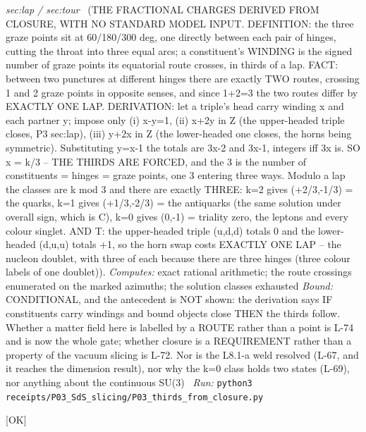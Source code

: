 \begin{description}
\textit{sec:lap / sec:tour} \ (THE FRACTIONAL CHARGES DERIVED FROM CLOSURE, WITH NO STANDARD MODEL INPUT. DEFINITION: the three graze points sit at 60/180/300 deg, one directly between each pair of hinges, cutting the throat into three equal arcs; a constituent's WINDING is the signed number of graze points its equatorial route crosses, in thirds of a lap. FACT: between two punctures at different hinges there are exactly TWO routes, crossing 1 and 2 graze points in opposite senses, and since 1+2=3 the two routes differ by EXACTLY ONE LAP. DERIVATION: let a triple's head carry winding x and each partner y; impose only (i) x-y=1, (ii) x+2y in Z (the upper-headed triple closes, P3 sec:lap), (iii) y+2x in Z (the lower-headed one closes, the horns being symmetric). Substituting y=x-1 the totals are 3x-2 and 3x-1, integers iff 3x is. SO x = k/3 -- THE THIRDS ARE FORCED, and the 3 is the number of constituents = hinges = graze points, one 3 entering three ways. Modulo a lap the classes are k mod 3 and there are exactly THREE: k=2 gives (+2/3,-1/3) = the quarks, k=1 gives (+1/3,-2/3) = the antiquarks (the same solution under overall sign, which is C), k=0 gives (0,-1) = triality zero, the leptons and every colour singlet. AND T: the upper-headed triple (u,d,d) totals 0 and the lower-headed (d,u,u) totals +1, so the horn swap costs EXACTLY ONE LAP -- the nucleon doublet, with three of each because there are three hinges (three colour labels of one doublet)). 
\emph{Computes:} exact rational arithmetic; the route crossings enumerated on the marked azimuths; the solution classes exhausted
 \emph{Bound:} CONDITIONAL, and the antecedent is NOT shown: the derivation says IF constituents carry windings and bound objects close THEN the thirds follow. Whether a matter field here is labelled by a ROUTE rather than a point is L-74 and is now the whole gate; whether closure is a REQUIREMENT rather than a property of the vacuum slicing is L-72. Nor is the L8.1-a weld resolved (L-67, and it reaches the dimension result), nor why the k=0 class holds two states (L-69), nor anything about the continuous SU(3)
\ \emph{Run:} \texttt{python3 receipts/P03\_SdS\_slicing/P03\_thirds\_from\_closure.py}
\item[\rcptlabel{P03_winding_and_closure}{P3R50}\textbf{P3R50}\quad\texttt{P03\_winding\_and\_closure}]\hfill\textsf{[OK]}\\

\end{description}
